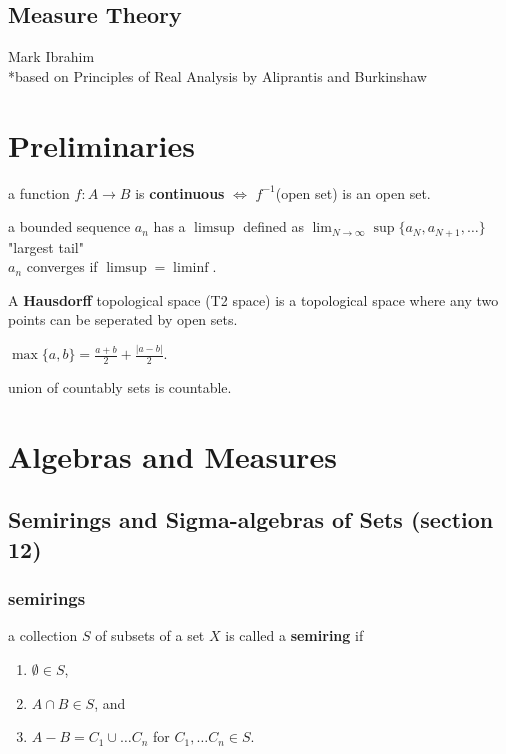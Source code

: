 \documentclass[a4paper, 12pt]{article}
\title{}
\date{}
\newcommand{\bt}[1]{\textbf{#1}} %
\begin{document}
\begin{center}
\section*{Measure Theory}
Mark Ibrahim \\
*based on Principles of Real Analysis by Aliprantis and Burkinshaw
\end{center}

\tableofcontents
\begin{multicols}{2}

\section{Preliminaries}

a function $f: A \rightarrow B$ is \bt{continuous}
$\iff$ $f^{-1}$(open set) is an open set.

a bounded sequence $a_n$ has a \bt{$\limsup$} defined as 
$\lim_{N \rightarrow \infty} \sup\{a_N, a_{N+1}, \dots \}$
"largest tail"\\
$a_n$ converges if $\limsup = \liminf$.

A \bt{Hausdorff} topological space (T2 space) is a topological space where 
any two points can be seperated by open sets.

$\max\{a, b\} = \frac{a + b}{2} + \frac{|a - b|}{2}$.

union of countably sets is countable.

\section{Algebras and Measures}
\subsection{Semirings and Sigma-algebras of Sets (section 12)}

\subsubsection{semirings}
a collection $S$ of subsets of a set $X$ is called a 
\bt{semiring} if  
\begin{enumerate}
    \item $\emptyset \in S$, 
    \item $A \cap B \in S$, and 
    \item $A - B = C_1 \cup \dots C_n$ for $C_1, \dots C_n \in S$.
\end{enumerate}


\end{multicols}
\end{document}
